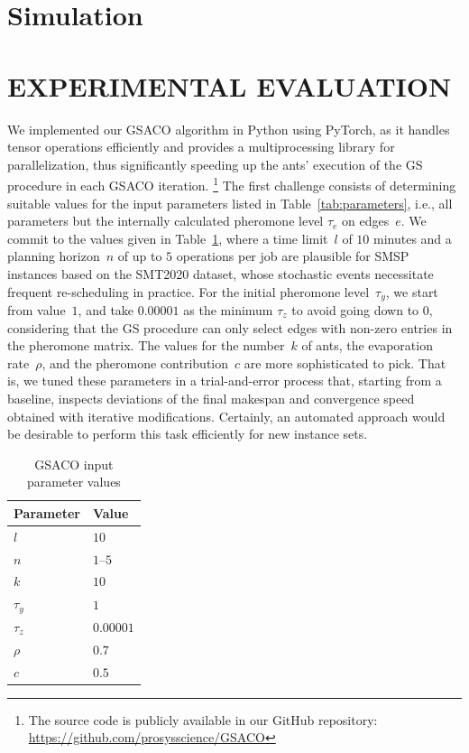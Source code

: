 \documentclass[runningheads]{llncs}
\begin{document}
\section{Simulation}
\label{sec:sim}


\section{\uppercase{Experimental Evaluation}}
\label{sec:results}

We implemented our GSACO algorithm in Python using PyTorch, as it handles tensor operations efficiently and provides a multiprocessing library for
parallelization, thus significantly speeding up the ants' execution of the GS procedure in each GSACO iteration.%
\footnote{The source code is publicly available in our GitHub repository:
\url{https://github.com/prosysscience/GSACO}}
The first challenge consists of determining suitable values for the input
parameters listed in Table~\ref{tab:parameters}, i.e.,
all parameters but the internally calculated pheromone level $\tau_e$ on edges~$e$.
We commit to the values given in Table~\ref{tab:p_value},
where a time limit~$l$ of $10$ minutes and a planning horizon~$n$ of
up to $5$ operations per job are plausible for SMSP instances
based on the SMT2020 dataset, whose stochastic events necessitate frequent
re-scheduling in practice.
For the initial pheromone level~$\tau_y$,
we start from value~$1$, and take $0.00001$ as the minimum $\tau_z$
to avoid going down to $0$, considering that the GS procedure can only
select edges with non-zero entries in the pheromone matrix.
The values for the number~$k$ of ants, the evaporation rate~$\rho$,
and the pheromone contribution~$c$ are more sophisticated to pick.
That is, we tuned these parameters in a trial-and-error process that,
starting from a baseline, inspects deviations of the final makespan and convergence speed obtained with iterative modifications.
Certainly, an automated approach would be desirable to
perform this task efficiently for new instance sets.%
%
\begin{table}[t]
\caption{GSACO input parameter values}\label{tab:p_value} \centering
\begin{tabular}{ll}
	\hline
	Parameter & Value \\ \hline
	$l$ & $10$        \\
	$n$ & $1$--$5$ \\
	$k$ & $10$ \\
	$\tau_{y}$ & $1$ \\
	$\tau_{z}$ & $0.00001$ \\
	$\rho$ & $0.7$ \\
	$c$ & $0.5$ \\
	\hline
\end{tabular}
\end{table}
\end{document}
